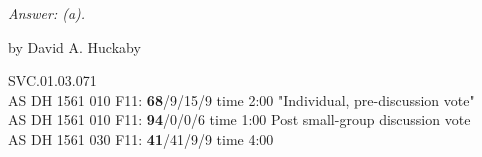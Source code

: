	
\emph{Answer: (a).}

	by David A. Huckaby

SVC.01.03.071 \\
AS DH 1561 010 F11: {\bf 68}/9/15/9 time 2:00 "Individual, pre-discussion vote" \\
AS DH 1561 010 F11: {\bf 94}/0/0/6 time 1:00 Post small-group discussion vote \\
AS DH 1561 030 F11: {\bf 41}/41/9/9 time 4:00  \\
